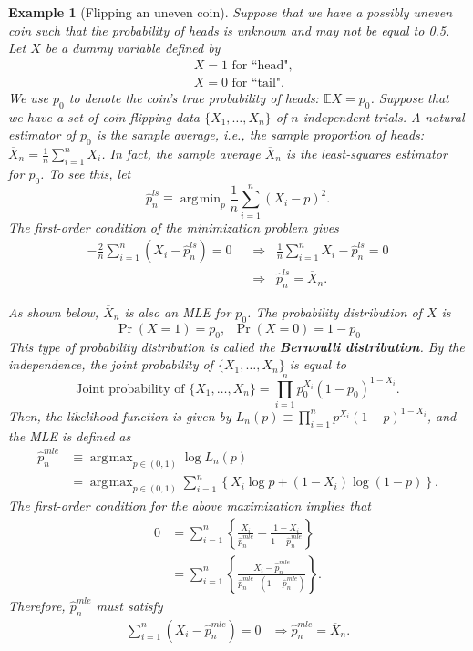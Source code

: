 \documentclass[10.5pt, A4paper, openany, uplatex]{book}
\newcommand{\E}{\mathbb{E}}
\renewcommand{\hat}{\widehat}
\renewcommand{\bar}{\overline}
\newtheorem{example}[theorem]{Example}
\numberwithin{equation}{section}
\DeclareMathOperator*{\argmin}{\arg\!\min}
\DeclareMathOperator*{\argmax}{\arg\!\max}
\begin{document}
\begin{example}[Flipping an uneven coin]\label{ex:coin}\upshape
Suppose that we have a possibly uneven coin such that the probability of heads is unknown and may not be equal to 0.5. 
Let $X$ be a dummy variable defined by
\begin{align*}
&X = 1 \text{ for ``head",}\\
&X = 0 \text{ for ``tail".}
\end{align*}
We use $p_0$ to denote the coin's true probability of heads: $\E X = p_0$. 
Suppose that we have a set of coin-flipping data $\{X_1, \ldots , X_n \}$ of $n$ independent trials.
A natural estimator of $p_0$ is the sample average, i.e., the sample proportion of heads: $\bar{X}_n = \frac{1}{n}\sum_{i = 1}^n X_i$.
In fact, the sample average $\bar{X}_n$ is the least-squares estimator for $p_0$.
To see this, let
\[
	\hat p_n^{ls} \equiv \argmin_{p} \frac{1}{n}\sum_{i=1}^n (X_i - p)^2.
\]
The first-order condition of the minimization problem gives
\begin{align*}
	- \frac{2}{n} \sum_{i = 1}^n (X_i - \hat p_n^{ls}) = 0 \;\; 
	& \Rightarrow \;\; \frac{1}{n}\sum_{i = 1}^n X_i  -  \hat p_n^{ls} = 0 \\
	& \Rightarrow \;\; \hat p_n^{ls} = \bar{X}_n.
\end{align*}

As shown below, $\bar{X}_n$ is also an MLE for $p_0$.
The probability distribution of $X$ is
\[
	\Pr(X = 1) = p_0, \;\; \Pr(X = 0) = 1- p_0
\]
This type of probability distribution is called the \textbf{Bernoulli distribution}.
By the independence, the joint probability of $\{X_1, \ldots , X_n\}$ is equal to
\[
	\text{Joint probability of $\{X_1, \ldots, X_n\}$} = \prod_{i = 1}^n  p_0^{X_i} (1 - p_0)^{1-X_i}.
\]
Then, the likelihood function is given by $L_n(p) \equiv \prod_{i = 1}^n  p^{X_i} (1 - p)^{1-X_i}$, and the MLE is defined as
\begin{align*}
	\hat{p}^{mle}_n 
	& \equiv \argmax_{p \in (0,1)} \log L_n(p) \\
	& = \argmax_{p \in (0,1)} \sum_{i =1}^n\left\{ X_i\log p + (1 - X_i)\log( 1-p)\right\}.
\end{align*}
The first-order condition for the above maximization implies that 
\begin{align*}
	0
	& = \sum_{i=1}^n\left\{ \frac{X_i}{\hat{p}^{mle}_n} - \frac{1 - X_i}{1 - \hat{p}^{mle}_n} \right\}\\
	& = \sum_{i=1}^n\left\{ \frac{X_i - \hat{p}^{mle}_n}{\hat{p}^{mle}_n \cdot (1 - \hat{p}^{mle}_n)} \right\}.
\end{align*}
Therefore, $\hat{p}_n^{mle}$ must satisfy
\begin{align*}
\sum_{i=1}^n (X_i - \hat{p}_n^{mle}) = 0
& \Rightarrow \hat{p}_n^{mle} = \bar{X}_n.
\end{align*}
\end{example}
\bigskip
\end{document}
